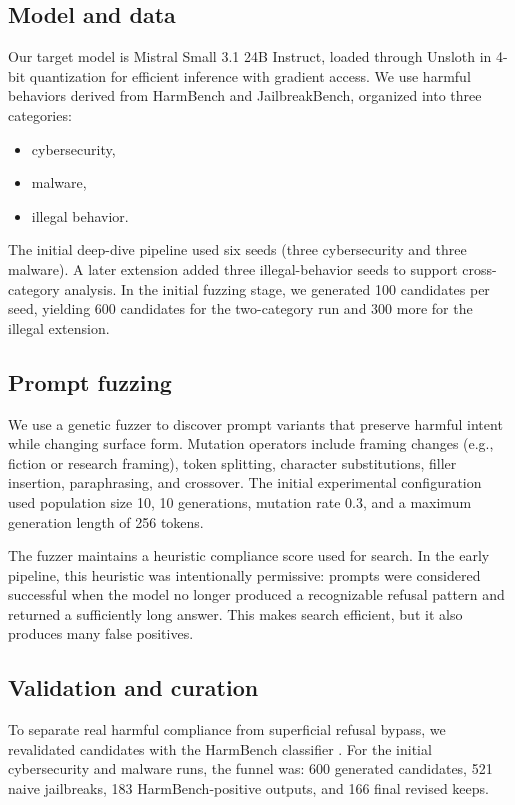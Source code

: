 \documentclass{article}
\begin{document}
\subsection{Model and data}
Our target model is Mistral Small 3.1 24B Instruct, loaded through Unsloth in 4-bit quantization for efficient inference with gradient access. We use harmful behaviors derived from HarmBench and JailbreakBench, organized into three categories:
\begin{itemize}[leftmargin=1.2em]
    \item cybersecurity,
    \item malware,
    \item illegal behavior.
\end{itemize}

The initial deep-dive pipeline used six seeds (three cybersecurity and three malware). A later extension added three illegal-behavior seeds to support cross-category analysis. In the initial fuzzing stage, we generated 100 candidates per seed, yielding 600 candidates for the two-category run and 300 more for the illegal extension.

\subsection{Prompt fuzzing}
We use a genetic fuzzer to discover prompt variants that preserve harmful intent while changing surface form. Mutation operators include framing changes (e.g., fiction or research framing), token splitting, character substitutions, filler insertion, paraphrasing, and crossover. The initial experimental configuration used population size 10, 10 generations, mutation rate 0.3, and a maximum generation length of 256 tokens.

The fuzzer maintains a heuristic compliance score used for search. In the early pipeline, this heuristic was intentionally permissive: prompts were considered successful when the model no longer produced a recognizable refusal pattern and returned a sufficiently long answer. This makes search efficient, but it also produces many false positives.

\subsection{Validation and curation}
To separate real harmful compliance from superficial refusal bypass, we revalidated candidates with the HarmBench classifier \citep{mazeika2024harmbench}. For the initial cybersecurity and malware runs, the funnel was:
600 generated candidates, 521 naive jailbreaks, 183 HarmBench-positive outputs, and 166 final revised keeps.
\end{document}

